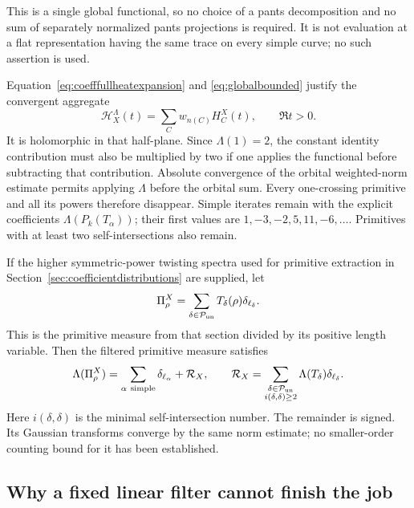 This is a single global functional, so no choice of a pants
decomposition and no sum of separately normalized pants projections
is required. It is not evaluation at a flat representation having
the same trace on every simple curve; no such assertion is used.

Equation~\eqref{eq:coefffullheatexpansion} and
\eqref{eq:globalbounded} justify the convergent aggregate
\begin{equation}
 \mathcal H_X^\Lambda(t)=\sum_C w_{n(C)}H_C^X(t),
 \qquad \Re t>0.
 \label{eq:globalfilteredheat}
\end{equation}
It is holomorphic in that half-plane. Since $\Lambda(1)=2$, the
constant identity contribution must also be multiplied by two if
one applies the functional before subtracting that contribution.
Absolute convergence of the
orbital weighted-norm estimate permits applying $\Lambda$ before
the orbital sum. Every one-crossing primitive and all its powers
therefore disappear. Simple iterates remain with the explicit
coefficients $\Lambda(P_k(T_\alpha))$; their first values are
$1,-3,-2,5,11,-6,\ldots$. Primitives with at least two
self-intersections also remain.

If the higher symmetric-power twisting spectra used for primitive
extraction in Section~\ref{sec:coefficientdistributions} are supplied,
let
\[
 \Pi_\rho^X=\sum_{\delta\in\mathcal P_{\rm un}}
                T_\delta(\rho)\delta_{\ell_\delta}.
\]
This is the primitive measure from that section divided by its
positive length variable. Then the filtered primitive measure satisfies
\begin{equation}
 \Lambda(\Pi_\rho^X)
 =\sum_{\alpha\ {\rm simple}}\delta_{\ell_\alpha}
      +\mathcal R_X,
 \qquad
 \mathcal R_X=
 \sum_{\substack{\delta\in\mathcal P_{\rm un}\\i(\delta,\delta)\geq2}}
      \Lambda(T_\delta)\delta_{\ell_\delta}.
 \label{eq:globalresidual}
\end{equation}
Here $i(\delta,\delta)$ is the minimal self-intersection number.
The remainder is signed. Its Gaussian transforms converge by the
same norm estimate; no smaller-order counting bound for it has
been established.

\subsection{Why a fixed linear filter cannot finish the job}

